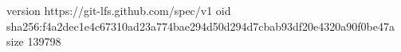 version https://git-lfs.github.com/spec/v1
oid sha256:f4a2dec1e4c67310ad23a774bae294d50d294d7cbab93df20e4320a90f0be47a
size 139798

